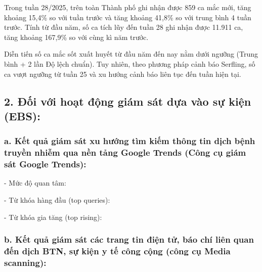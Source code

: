 \documentclass[
]{article}
\begin{document}
Trong tuần 28/2025, trên toàn Thành phố ghi nhận được 859 ca mắc mới,
tăng khoảng 15,4\% so với tuần trước và tăng khoảng 41,8\% so với trung
bình 4 tuần trước. Tính từ đầu năm, số ca tích lũy đến tuần 28 ghi nhận
được 11.911 ca, tăng khoảng 167,9\% so với cùng kì năm trước.

Diễn tiến số ca mắc sốt xuất huyết từ đầu năm đến nay nằm dưới ngưỡng
(Trung bình + 2 lần Độ lệch chuẩn). Tuy nhiên, theo phương pháp cảnh báo
Serfling, số ca vượt ngưỡng từ tuần 25 và xu hướng cảnh báo liên tục đến
tuần hiện tại.

\subsection{2. Đối với hoạt động giám sát dựa vào sự kiện
(EBS):}\label{ux111ux1ed1i-vux1edbi-houx1ea1t-ux111ux1ed9ng-giuxe1m-suxe1t-dux1ef1a-vuxe0o-sux1ef1-kiux1ec7n-ebs}

\subsubsection{a. Kết quả giám sát xu hướng tìm kiếm thông tin dịch bệnh
truyền nhiễm qua nền tảng Google Trends (Công cụ giám sát Google
Trends):}\label{a.-kux1ebft-quux1ea3-giuxe1m-suxe1t-xu-hux1b0ux1edbng-tuxecm-kiux1ebfm-thuxf4ng-tin-dux1ecbch-bux1ec7nh-truyux1ec1n-nhiux1ec5m-qua-nux1ec1n-tux1ea3ng-google-trends-cuxf4ng-cux1ee5-giuxe1m-suxe1t-google-trends}

- Mức độ quan tâm:

- Từ khóa hàng đầu (top queries):

- Từ khóa gia tăng (top rising):

\subsubsection{b. Kết quả giám sát các trang tin điện tử, báo chí liên
quan đến dịch BTN, sự kiện y tế công cộng (công cụ Media
scanning):}\label{b.-kux1ebft-quux1ea3-giuxe1m-suxe1t-cuxe1c-trang-tin-ux111iux1ec7n-tux1eed-buxe1o-chuxed-liuxean-quan-ux111ux1ebfn-dux1ecbch-btn-sux1ef1-kiux1ec7n-y-tux1ebf-cuxf4ng-cux1ed9ng-cuxf4ng-cux1ee5-media-scanning}
\end{document}
